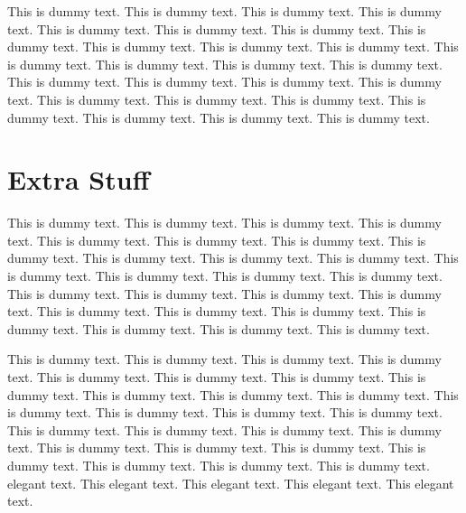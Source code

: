 \documentclass{book}
\begin{document}
This is dummy text. This is dummy text. This is dummy text. This is dummy text. This is dummy text. This is dummy text. This is dummy text. This is dummy text. This is dummy text. This is dummy text. This is dummy text. This is dummy text. This is dummy text. This is dummy text. This is dummy text. This is dummy text. This is dummy text. This is dummy text. This is dummy text. This is dummy text. This is dummy text. This is dummy text. This is dummy text. This is dummy text. This is dummy text. This is dummy text. 


\appendix

\noappendicestocpagenum	 %
\addappheadtotoc	%

\renewcommand{\theequation}{A-\arabic{equation}} %
\setcounter{equation}{0}  %

\renewcommand{\thesection}{A-\arabic{section}} %
\setcounter{section}{0}  %

\renewcommand{\thetable}{A-\arabic{table}} %
\setcounter{table}{0}  %

\chapter{Extra Stuff}\label{Extra}

This is dummy text. This is dummy text. This is dummy text. This is dummy text. This is dummy text. This is dummy text. This is dummy text. This is dummy text. This is dummy text. This is dummy text. This is dummy text. This is dummy text. This is dummy text. This is dummy text. This is dummy text. This is dummy text. This is dummy text. This is dummy text. This is dummy text. This is dummy text. This is dummy text. This is dummy text. This is dummy text. This is dummy text. This is dummy text. This is dummy text. 

This is dummy text. This is dummy text. This is dummy text. This is dummy text. This is dummy text. This is dummy text. This is dummy text. This is dummy text. This is dummy text. This is dummy text. This is dummy text. This is dummy text. This is dummy text. This is dummy text. This is dummy text. This is dummy text. This is dummy text. This is dummy text. This is dummy text. This is dummy text. This is dummy text. This is dummy text. This is dummy text. This is dummy text. This is dummy text. This is dummy text. elegant text. This elegant text. This elegant text. This elegant text. This elegant text. 
\end{document}
